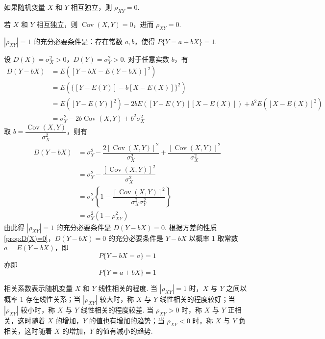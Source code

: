 \begin{property}
    如果随机变量 $X$ 和 $Y$ 相互独立，则 $\rho_{XY} = 0$.
\end{property}

\begin{myproof}
    若 $X$ 和 $Y$ 相互独立，则 $\operatorname{Cov}(X,Y) = 0$，进而 $\rho_{XY} = 0$.
\end{myproof}

\begin{property}
    $|\rho_{XY}|=1$ 的充分必要条件是：存在常数 $a,b$，使得 $P\{Y=a+bX\}=1$.
\end{property}

\begin{myproof}
    设 $D(X) = \sigma_X^2 > 0$，$D(Y) = \sigma_Y^2 > 0$. 对于任意实数 $b$，有
    $$
    \begin{aligned}
        D(Y-bX) &= E([Y-bX - E(Y-bX)]^2) \\
        &= E( \{[Y-E(Y)] - b[X-E(X)]\}^2 ) \\
        &= E([Y-E(Y)]^2) - 2bE([Y-E(Y)][X-E(X)]) + b^2 E([X-E(X)]^2) \\
        &= \sigma_Y^2 - 2b \operatorname{Cov}(X,Y) + b^2 \sigma_X^2
    \end{aligned}
    $$
    取 $b = \dfrac{\operatorname{Cov}(X,Y)}{\sigma_X^2}$，则有
    $$
    \begin{aligned}
        D(Y-bX) &= \sigma_Y^2 - \dfrac{2 [\operatorname{Cov}(X,Y)]^2}{\sigma_X^2} + \dfrac{[\operatorname{Cov}(X,Y)]^2}{\sigma_X^2} \\
        &= \sigma_Y^2 - \dfrac{[\operatorname{Cov}(X,Y)]^2}{\sigma_X^2} \\
        &= \sigma_Y^2 \left\{ 1 - \dfrac{[\operatorname{Cov}(X,Y)]^2}{\sigma_X^2 \sigma_Y^2} \right\} \\
        &= \sigma_Y^2 (1 - \rho_{XY}^2)
    \end{aligned}
    $$
    由此得 $|\rho_{XY}|=1$ 的充分必要条件是 $D(Y-bX)=0$. 根据方差的性质\ref*{prop:D(X)=0}，$D(Y-bX)=0$ 的充分必要条件是 $Y-bX$ 以概率 1 取常数 $a=E(Y-bX)$，即
    $$
    P \{ Y-bX=a \} = 1
    $$
    亦即
    $$
    P\{Y=a+bX\}=1
    $$
\end{myproof}

相关系数表示随机变量 $X$ 和 $Y$ 线性相关的程度. 当 $|\rho_{XY}|=1$ 时，$X$ 与 $Y$ 之间以概率 1 存在线性关系；当 $|\rho_{XY}|$ 较大时，称 $X$ 与 $Y$ 线性相关的程度较好；当 $|\rho_{XY}|$ 较小时，称 $X$ 与 $Y$ 线性相关的程度较差. 当 $\rho_{XY} > 0$ 时，称 $X$ 与 $Y$ 正相关，这时随着 $X$ 的增加，$Y$ 的值也有增加的趋势；当 $\rho_{XY} < 0$ 时，称 $X$ 与 $Y$ 负相关，这时随着 $X$ 的增加，$Y$ 的值有减小的趋势.

